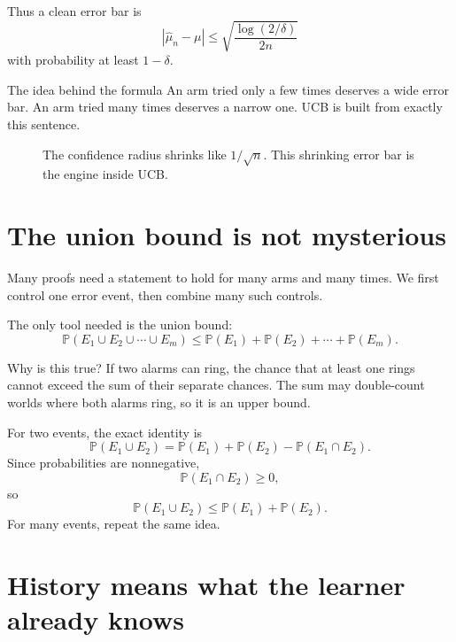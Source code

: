 \documentclass[en,nofont,11pt]{elegantbook}
\newcommand{\Pp}{\mathbb{P}}
\begin{document}
Thus a clean error bar is
\[
\left|\widehat\mu_n-\mu\right|
\leq
\sqrt{\frac{\log(2/\delta)}{2n}}
\]
with probability at least $1-\delta$.

\begin{plainbox}{The idea behind the formula}
An arm tried only a few times deserves a wide error bar. An arm tried many times deserves a narrow one. UCB is built from exactly this sentence.
\end{plainbox}

\begin{figure}[h]
\centering
{}
\caption{The confidence radius shrinks like $1/\sqrt{n}$. This shrinking error bar is the engine inside UCB.}
\end{figure}

\section{The union bound is not mysterious}

Many proofs need a statement to hold for many arms and many times. We first control one error event, then combine many such controls.

The only tool needed is the union bound:
\[
\Pp(E_1\cup E_2\cup\cdots\cup E_m)
\leq
\Pp(E_1)+\Pp(E_2)+\cdots+\Pp(E_m).
\]

Why is this true? If two alarms can ring, the chance that at least one rings cannot exceed the sum of their separate chances. The sum may double-count worlds where both alarms ring, so it is an upper bound.

For two events, the exact identity is
\[
\Pp(E_1\cup E_2)
=
\Pp(E_1)+\Pp(E_2)-\Pp(E_1\cap E_2).
\]
Since probabilities are nonnegative,
\[
\Pp(E_1\cap E_2)\geq 0,
\]
so
\[
\Pp(E_1\cup E_2)
\leq
\Pp(E_1)+\Pp(E_2).
\]
For many events, repeat the same idea.

\section{History means what the learner already knows}
\end{document}
